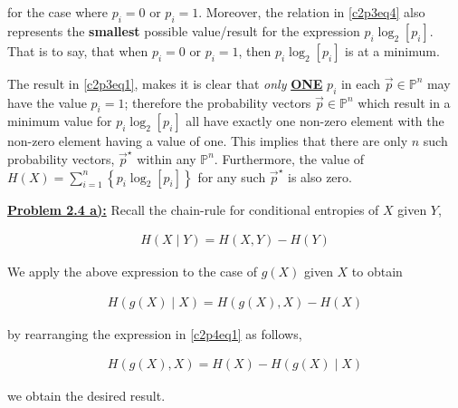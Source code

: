 \documentclass{article}[12pt]
\numberwithin{equation}{subsection}
\newcommand{\prob}[1]{\textbf{\underline{Problem #1):}}}
\begin{document}
\begin{flushleft}
for the case where $p_i = 0$ or $p_i = 1$.  Moreover, the relation in \ref{c2p3eq4} also represents the \textbf{smallest} possible value/result for the expression $p_i \log_2 \left[ p_i \right]$.  That is to say, that when $p_i = 0$ or $p_i = 1$, then $p_i \log_2 \left[ p_i \right]$ is at a minimum.  \newline


The result in \ref{c2p3eq1}, makes it is clear that \emph{only} \textbf{\underline{ONE}} $p_i$ in each $\vec{p} \in \mathbb{P}^n$ may have the value $p_i = 1$; therefore the probability vectors $\vec{p} \in \mathbb{P}^n$ which result in a minimum value for $p_i \log_2 \left[ p_i \right]$ all have exactly one non-zero element with the non-zero element having a value of one.  This implies that there are only $n$ such probability vectors, $\vec{p}^\star$ within any $\mathbb{P}^n$.  Furthermore, the value of $H(X) = \sum_{i=1}^n \left\{ p_i \log_2 \left[ p_i \right] \right\}$ for any such $\vec{p}^\star$ is also zero.



\vspace{0.5in}

\prob{2.4 a}  Recall the chain-rule for conditional entropies of $X$ given $Y$,

\begin{align*}
H \left( X \mid Y \right) = H \left( X, Y \right) - H \left( Y \right)
\end{align*}

We apply the above expression to the case of $g \left( X \right)$ given $X$ to obtain

\begin{align} \label{c2p4eq1}
H \left( g \left( X \right) \mid X \right) = H \left( g \left( X \right), X \right) - H \left( X \right)  \tag{2.4-1}
\end{align}

by rearranging the expression in \ref{c2p4eq1} as follows,

\begin{align} \label{c2p4eq2}
H \left( g \left( X \right), X \right) = H \left( X \right) - H \left( g \left( X \right) \mid X \right)  \tag{2.4-2}
\end{align}

we obtain the desired result.



\vspace{0.5in}


\end{flushleft}
\end{document}

